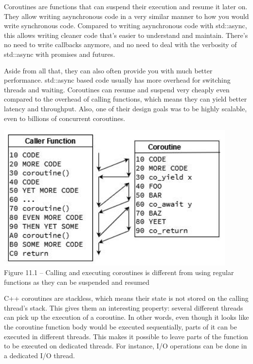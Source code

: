 
Coroutines are functions that can suspend their execution and resume it later on. They allow writing asynchronous code in a very similar manner to how you would write synchronous code. Compared to writing asynchronous code with std::async, this allows writing cleaner code that's easier to understand and maintain. There's no need to write callbacks anymore, and no need to deal with the verbosity of std::async with promises and futures.

Aside from all that, they can also often provide you with much better performance. std::async based code usually has more overhead for switching threads and waiting. Coroutines can resume and suspend very cheaply even compared to the overhead of calling functions, which means they can yield better latency and throughput. Also, one of their design goals was to be highly scalable, even to billions of concurrent coroutines.

\begin{center}
\includegraphics[width=0.9\textwidth]{content/3/chapter11/images/1.jpg}\\
Figure 11.1 – Calling and executing coroutines is different from using regular functions as they can be suspended and resumed
\end{center}

C++ coroutines are stackless, which means their state is not stored on the calling thread's stack. This gives them an interesting property: several different threads can pick up the execution of a coroutine. In other words, even though it looks like the coroutine function body would be executed sequentially, parts of it can be executed in different threads. This makes it possible to leave parts of the function to be executed on dedicated threads. For instance, I/O operations can be done in a dedicated I/O thread.

